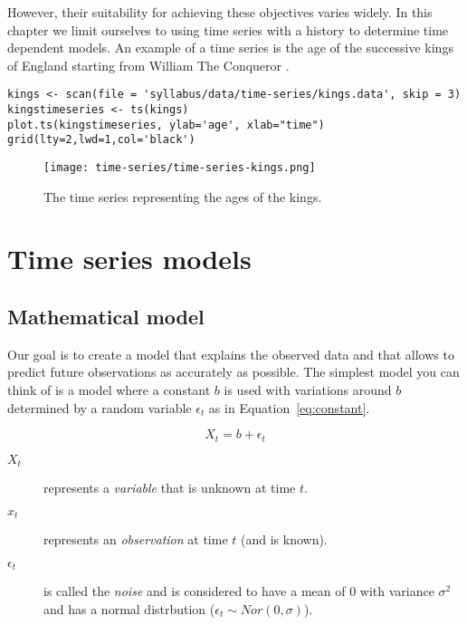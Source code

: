 However, their suitability for achieving these objectives varies widely. In this chapter we limit ourselves to using time series with a history to determine time dependent models. An example of a time series is the age of the successive kings of England starting from William The Conqueror \autocite{Hipel1994}.

\begin{lstlisting}
kings <- scan(file = 'syllabus/data/time-series/kings.data', skip = 3)
kingstimeseries <- ts(kings)
plot.ts(kingstimeseries, ylab='age', xlab="time")
grid(lty=2,lwd=1,col='black')
\end{lstlisting}

\begin{figure}
	\centering
	\texttt{[image: time-series/time-series-kings.png]}
	\caption{The time series representing the ages of the kings.}
	\label{fig:time-series-11}
\end{figure}

\section{Time series models}

\subsection{Mathematical model}

Our goal is to create a model that explains the observed data and that allows to predict future observations as accurately as possible. The simplest model you can think of is a model where a constant $b$ is used with variations around $b$ determined by a random variable $\epsilon_{t}$ as in Equation~\ref{eq:constant}.

\begin{equation}
	X_{t} = b + \epsilon_{t}
\label{eq:constant}
\end{equation}

\begin{description}
  \item [$X_{t}$] represents a \emph{variable} that is unknown at time $t$.
  \item [$x_{t}$] represents an \emph{observation} at time $t$ (and is known). 
  \item [$\epsilon_{t}$] is called the \emph{noise} and is considered to have a mean of $0$ with variance $\sigma^{2}$ and has a normal distrbution ($\epsilon_{t} \sim Nor(0, \sigma)$). 
\end{description}

